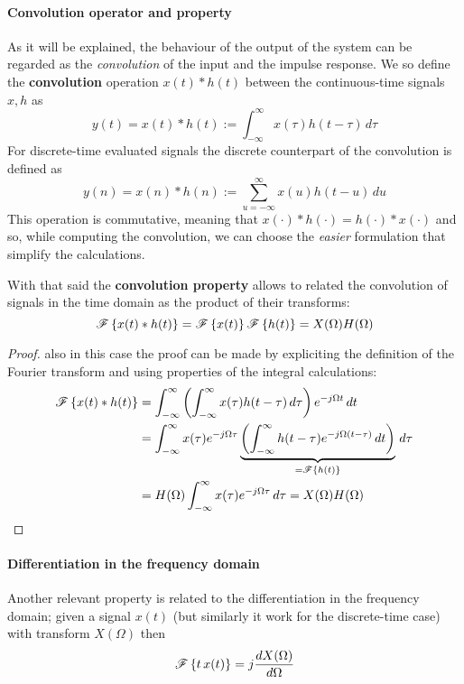 		\paragraph{Convolution operator and property} As it will be explained, the behaviour of the output of the system can be regarded as the \textit{convolution} of the input and the impulse response. We so define the \textbf{convolution} operation $x(t)*h(t)$ between the continuous-time signals $x,h$ as 
		\begin{equation}
			y(t) = x(t) * h(t) := \int_{-\infty}^\infty x(\tau) h(t-\tau)\, d\tau
		\end{equation}
		For discrete-time evaluated signals the discrete counterpart of the convolution is defined as
		\begin{equation}
			y(n) = x(n) * h(n) := \sum_{u=-\infty}^\infty x(u) h(t-u)\, du
		\end{equation}
		This operation is commutative, meaning that $x(\cdot)*h(\cdot) = h(\cdot)*x(\cdot)$ and so, while computing the convolution, we can choose the \textit{easier} formulation that simplify the calculations.
	
		With that said the \textbf{convolution property} allows to related the convolution of signals in the time domain as the product of their transforms:
		\begin{equation} \label{eq:four:convolution}
			\mathscr{F}\left\{ x(t)*h(t) \right\} = \mathscr{F}\left\{ x(t) \right\} \mathscr{F}\left\{ h(t) \right\} = X(\Omega) H(\Omega)
		\end{equation}
		
		\begin{proof}
			also in this case the proof can be made by expliciting the definition of the Fourier transform and using properties of the integral calculations:
			\begin{align*}
				\mathscr{F}\left\{ x(t) * h(t) \right\} & = \int_{-\infty}^\infty \left( \int_{-\infty}^\infty x(\tau) h(t-\tau)\, d\tau \right) e^{-j\Omega t} \, dt \\
				& =  \int_{-\infty}^\infty x(\tau) e^{-j\Omega \tau} \underbrace{\left( \int_{-\infty}^\infty h(t-\tau) e^{-j\Omega(t-\tau)} \, dt \right)}_{=\mathscr{F}\left\{ h(t) \right\}} \, d\tau \\
				& = H(\Omega) \int_{-\infty}^\infty x(\tau) e^{-j\Omega \tau} \, d\tau = X(\Omega) H(\Omega)
			\end{align*}
		\end{proof}
	
		\paragraph{Differentiation in the frequency domain} Another relevant property is related to the differentiation in the frequency domain; given a signal $x(t)$ (but similarly it work for the discrete-time case) with transform $X(\Omega)$ then
		\begin{equation} \label{eq:four:differentiation}
			\mathscr{F}\left\{ t\,x(t) \right\} = j \frac{dX(\Omega)}{d\Omega}
		\end{equation}
	
